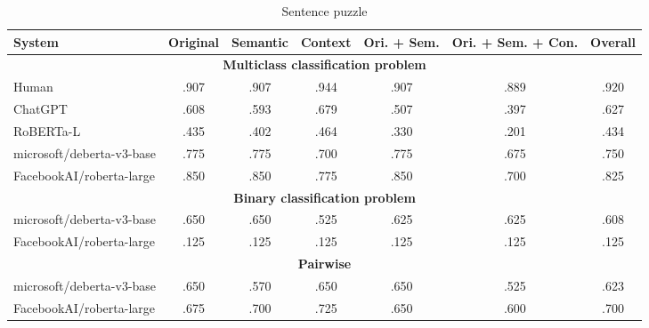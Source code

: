 \FloatBarrier
\begin{table*}
	\caption{Sentence puzzle}
	\label{tab:sentence-results-table}
	\begin{center}
		\begin{tabular}{lcccccc}
			\toprule
			\textbf{System}           & \textbf{Original} & \textbf{Semantic} & \textbf{Context} & \textbf{Ori. + Sem.} & \textbf{Ori. + Sem. + Con.} & \textbf{Overall} \\
			\midrule
			\multicolumn{7}{c}{\textbf{Multiclass classification problem}}                                                                                              \\
			\midrule
			\color{gray}Human         & \color{gray}.907  & \color{gray}.907  & \color{gray}.944 & \color{gray}.907     & \color{gray}.889            & \color{gray}.920 \\
			\color{gray}ChatGPT       & \color{gray}.608  & \color{gray}.593  & \color{gray}.679 & \color{gray}.507     & \color{gray}.397            & \color{gray}.627 \\
			\color{gray}RoBERTa-L     & \color{gray}.435  & \color{gray}.402  & \color{gray}.464 & \color{gray}.330     & \color{gray}.201            & \color{gray}.434 \\
			\midrule
			microsoft/deberta-v3-base & .775              & .775              & .700             & .775                 & .675                        & .750             \\
			FacebookAI/roberta-large  & .850              & .850              & .775             & .850                 & .700                        & .825             \\
			\midrule
			\multicolumn{7}{c}{\textbf{Binary classification problem}}                                                                                                   \\
			microsoft/deberta-v3-base & .650              & .650              & .525             & .625                 & .625                        & .608             \\
			FacebookAI/roberta-large  & .125              & .125              & .125             & .125                 & .125                        & .125             \\
			\midrule
			\multicolumn{7}{c}{\textbf{Pairwise}}                                                                                                                        \\
			\midrule
			microsoft/deberta-v3-base & .650              & .570              & .650             & .650                 & .525                        & .623             \\
			FacebookAI/roberta-large    & .675              & .700              & .725             & .650                 & .600                        & .700             \\
			\bottomrule
		\end{tabular}
	\end{center}
\end{table*}

